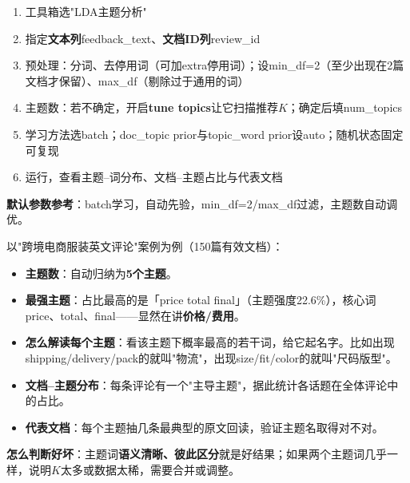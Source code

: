 \begin{algosposs}
\begin{enumerate}
    \item 工具箱选"LDA主题分析"
    \item 指定\textbf{文本列}feedback\_text、\textbf{文档ID列}review\_id
    \item 预处理：分词、去停用词（可加extra停用词）；设min\_df=2（至少出现在2篇文档才保留）、max\_df（剔除过于通用的词）
    \item 主题数：若不确定，开启\textbf{tune topics}让它扫描推荐$K$；确定后填num\_topics
    \item 学习方法选batch；doc\_topic prior与topic\_word prior设auto；随机状态固定可复现
    \item 运行，查看主题--词分布、文档--主题占比与代表文档
\end{enumerate}

\textbf{默认参数参考}：batch学习，自动先验，min\_df=2/max\_df过滤，主题数自动调优。
\end{algosposs}

\begin{algoresult}
以"跨境电商服装英文评论"案例为例（150篇有效文档）：

\begin{itemize}
    \item \textbf{主题数}：自动归纳为\textbf{5个主题}。
    \item \textbf{最强主题}：占比最高的是「price total final」（主题强度22.6\%），核心词price、total、final——显然在讲\textbf{价格/费用}。
    \item \textbf{怎么解读每个主题}：看该主题下概率最高的若干词，给它起名字。比如出现shipping/delivery/pack的就叫"物流"，出现size/fit/color的就叫"尺码版型"。
    \item \textbf{文档--主题分布}：每条评论有一个"主导主题"，据此统计各话题在全体评论中的占比。
    \item \textbf{代表文档}：每个主题抽几条最典型的原文回读，验证主题名取得对不对。
\end{itemize}

\textbf{怎么判断好坏}：主题词\textbf{语义清晰、彼此区分}就是好结果；如果两个主题词几乎一样，说明$K$太多或数据太稀，需要合并或调整。
\end{algoresult}

